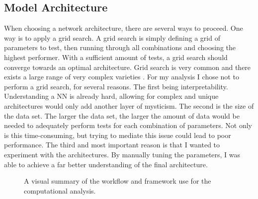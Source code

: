 \subsection{Model Architecture}
When choosing a network architecture, there are several ways to proceed. One way is to apply a grid search.
A grid search is simply defining a grid of parameters to test, then running through all combinations and 
choosing the highest performer. With a sufficient amount of tests, a grid search should converge towards 
an optimal architecture. Grid search is very common and there exists a large range of very complex varieties \cite{GS}.
For my analysis I chose not to perform a grid search, for several reasons. The first being interpretability.
Understanding a \ac{NN} is already hard, allowing for complex and unique architectures would only add another layer
of mysticism. The second is the size of the data set. The larger the data set, the larger the amount of data 
would be needed to adequately perform tests for each combination of parameters. Not only is this time-consuming,
but trying to mediate this issue could lead to poor performance. The third and most important reason is that 
I wanted to experiment with the architectures. By manually tuning the parameters, I was able to achieve a far 
better understanding of the final architecture. 
\begin{figure}
    \caption{A visual summary of the workflow and framework use for the 
    computational analysis. }
    \label{fig:arch}
\end{figure}
